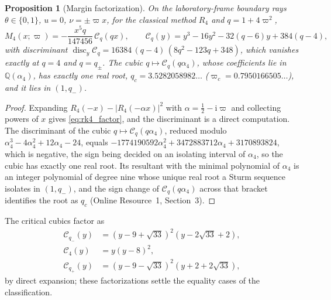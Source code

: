 \documentclass[pdflatex,sn-mathphys-num]{sn-jnl}
\newcommand{\ii}{\mathrm{i}}
\theoremstyle{thmstyleone}
\newtheorem{proposition}[theorem]{Proposition}
\theoremstyle{thmstylethree}
\theoremstyle{thmstyletwo}
\begin{document}
\begin{proposition}[Margin factorization]\label{prop:rk4factor}
On the laboratory-frame boundary rays $\theta\in\{0,1\}$, $u=0$, $\nu=\pm\varpi x$, for the classical method $R_4$ and $q=1+4\varpi^2$,
\begin{equation}
 M_4(x;\varpi)=-\frac{x^5q}{147456}\,\mathcal C_q(qx),\qquad
 \mathcal C_q(y)=y^3-16y^2-32(q-6)y+384(q-4),
 \label{eq:rk4_factor}
\end{equation}
with discriminant $\operatorname{disc}_y\mathcal C_q=16384\,(q-4)\,(8q^2-123q+348)$, which vanishes exactly at $q=4$ and $q=q_\pm$. The cubic $q\mapsto\mathcal C_q(q\alpha_4)$, whose coefficients lie in $\mathbb Q(\alpha_4)$, has exactly one real root, $q_c=3.5282058982\ldots$ ($\varpi_c=0.7950166505\ldots$), and it lies in $(1,q_-)$.
\end{proposition}

\begin{proof}
Expanding $R_4(-x)-|R_4(-\alpha x)|^2$ with $\alpha=\tfrac12-\ii\varpi$ and collecting powers of $x$ gives \eqref{eq:rk4_factor}, and the discriminant is a direct computation. The discriminant of the cubic $q\mapsto\mathcal C_q(q\alpha_4)$, reduced modulo $\alpha_4^3-4\alpha_4^2+12\alpha_4-24$, equals $-1774190592\alpha_4^2+3472883712\alpha_4+3170893824$, which is negative, the sign being decided on an isolating interval of $\alpha_4$, so the cubic has exactly one real root. Its resultant with the minimal polynomial of $\alpha_4$ is an integer polynomial of degree nine whose unique real root a Sturm sequence isolates in $(1,q_-)$, and the sign change of $\mathcal C_q(q\alpha_4)$ across that bracket identifies the root as $q_c$ (Online Resource~1, Section~3).
\end{proof}

The critical cubics factor as
\begin{equation}
\begin{aligned}
 \mathcal C_{q_-}(y)&=(y-9+\sqrt{33})^2(y-2\sqrt{33}+2),\\
 \mathcal C_4(y)&=y(y-8)^2,\\
 \mathcal C_{q_+}(y)&=(y-9-\sqrt{33})^2(y+2+2\sqrt{33}),
\end{aligned}
 \label{eq:critical_cubics}
\end{equation}
by direct expansion; these factorizations settle the equality cases of the classification.
\end{document}
